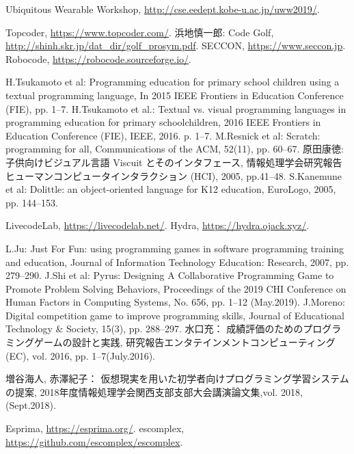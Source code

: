 \begin{thebibliography}{99}
	Ubiquitous Wearable Workshop, \url{http://cse.eedept.kobe-u.ac.jp/uww2019/}.


	Topcoder, \url{https://www.topcoder.com/}.
	浜地慎一郎: Code Golf, \url{http://shinh.skr.jp/dat_dir/golf_prosym.pdf}.
	SECCON, \url{https://www.seccon.jp}.
	Robocode, \url{https://robocode.sourceforge.io/}.

	H.Tsukamoto et al: Programming education for primary school children using a textual programming language, In 2015 IEEE Frontiers in Education Conference (FIE), pp. 1--7.
	H.Tsukamoto et al.: Textual vs. visual programming languages in programming education for primary schoolchildren, 2016 IEEE Frontiers in Education Conference (FIE), IEEE, 2016. p. 1--7.
	M.Resnick et al: Scratch: programming for all, Communications of the ACM, 52(11), pp. 60--67.
	原田康徳: 子供向けビジュアル言語 Viscuit とそのインタフェース, 情報処理学会研究報告ヒューマンコンピュータインタラクション (HCI), 2005, pp.41--48.
	S.Kanemune et al: Dolittle: an object-oriented language for K12 education, EuroLogo, 2005, pp. 144--153.

	LivecodeLab, \url{https://livecodelab.net/}.
	Hydra, \url{https://hydra.ojack.xyz/}.

	L.Ju: Just For Fun: using programming games in software programming training and education, Journal of Information Technology Education: Research, 2007, pp. 279--290.
	J.Shi et al: Pyrus: Designing A Collaborative Programming Game to Promote Problem Solving Behaviors, Proceedings of the 2019 CHI Conference on Human Factors in Computing Systems, No. 656, pp. 1–12 (May.2019).
	J.Moreno: Digital competition game to improve programming skills, Journal of Educational Technology \& Society, 15(3), pp. 288--297.
	水口充： 成績評価のためのプログラミングゲームの設計と実践, 研究報告エンタテインメントコンピューティング(EC), vol. 2016, pp. 1–7(July.2016).

	増谷海人, 赤澤紀子： 仮想現実を用いた初学者向けプログラミング学習システムの提案, 2018年度情報処理学会関西支部支部大会講演論文集,vol. 2018, (Sept.2018).

	Esprima, \url{https://esprima.org/}.
	escomplex, \url{https://github.com/escomplex/escomplex}.

\end{thebibliography}
